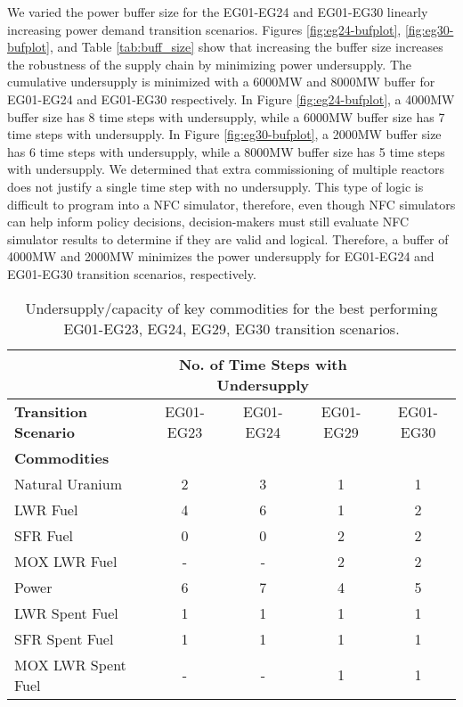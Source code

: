 We varied the power buffer size for the EG01-EG24 and EG01-EG30 
linearly increasing power demand transition scenarios. 
Figures \ref{fig:eg24-bufplot}, \ref{fig:eg30-bufplot}, 
and Table \ref{tab:buff_size} 
show that increasing the buffer size increases the robustness 
of the supply chain by minimizing power undersupply. 
The cumulative undersupply is minimized with a 6000MW and 8000MW 
buffer for EG01-EG24 and EG01-EG30 respectively.
In Figure \ref{fig:eg24-bufplot}, a 4000MW buffer size has 
8 time steps with undersupply, while a 6000MW buffer size has 
7 time steps with undersupply. 
In Figure \ref{fig:eg30-bufplot}, a 2000MW buffer size has 
6 time steps with undersupply, while a 8000MW buffer size has 
5 time steps with undersupply. 
We determined that extra commissioning of multiple reactors does not 
justify a single time step with no undersupply. 
This type of logic is difficult to program into a NFC simulator, 
therefore, even though NFC simulators can help inform policy decisions, 
decision-makers must still evaluate NFC simulator results to determine if 
they are valid and logical. 
Therefore, a buffer of 4000MW and 2000MW minimizes 
the power undersupply for EG01-EG24 and EG01-EG30 transition 
scenarios, respectively.

\begin{table}[]
	\centering
        \caption{Undersupply/capacity of key commodities for the best performing EG01-EG23, EG24, EG29, EG30 transition scenarios.}
		\label{tab:all-power-fin}
		\footnotesize
        \begin{tabular}{lcccc}
		\hline
		& \multicolumn{3}{c}{\textbf{No. of Time Steps with Undersupply}} \\ \hline
		\textbf{Transition Scenario} & EG01-EG23 & 
		EG01-EG24 & EG01-EG29 & EG01-EG30 \\ \hline 
		\textbf{Commodities} \\ 
		Natural Uranium		    & 2 	& 3  &  1  & 1 \\ 
		\gls{LWR} Fuel     	    & 4 	& 6  &  1  & 2\\ 
		\gls{SFR} Fuel     	    &  0 	& 0  &  2  & 2\\ 
		\gls{MOX} \gls{LWR} Fuel &-&-&2&2 \\
		Power      				&  6 	& 7  &  4 &  5\\ 
		\gls{LWR} Spent Fuel	& 1 	& 1  & 1 & 1\\ 
		\gls{SFR} Spent Fuel     	    &  1 	& 1  &  1  & 1\\ 
		\gls{MOX} \gls{LWR} Spent Fuel &-&-&1&1 \\ \hline 
	\end{tabular}
\end{table}

